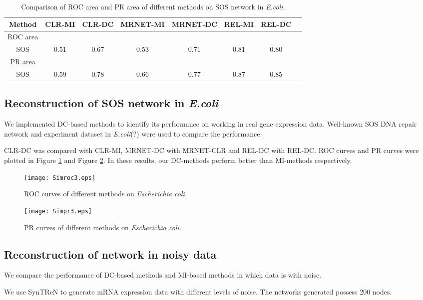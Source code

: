 \documentclass{bioinfo}
\begin{document}
\begin{table}[0.5\textwidth] \tiny
\centering \caption{Comparison of ROC area and PR area of different
methods on SOS network in \emph{E.coli}.}\label{roc-pr}
\begin{tabular}{cccccccc}
 \hline
 Method & CLR-MI & CLR-DC & MRNET-MI & MRNET-DC & REL-MI & REL-DC \\
 \hline
  ROC area\\
  SOS     & 0.51 & 0.67 & 0.53 & 0.71 & 0.81 & 0.80 \\
 PR area\\
  SOS   & 0.59 &0.78 & 0.66 & 0.77 & 0.87 & 0.85 \\
  \hline
\end{tabular}
\end{table}

\subsection{Reconstruction of SOS network in \emph{E.coli}}
We implemented DC-based methods to identify its performance on
working in real gene expression data. Well-known SOS DNA repair
network and experiment dataset in \emph{E.coli}(?) were used to
compare the performance.

CLR-DC was compared with CLR-MI, MRNET-DC with MRNET-CLR and REL-DC
with REL-DC. ROC curves and PR curves were plotted in Figure
\ref{roc-sos} and Figure \ref{pr-sos}. In these results, our
DC-methods perform better than MI-methods respectively.

\begin{figure}[!h]
  \texttt{[image: Simroc3.eps]}
  \caption{ROC curves of different methods on \emph{Escherichia coli.}}\label{roc-sos}
\end{figure}

\begin{figure}[!h]
  \texttt{[image: Simpr3.eps]}
  \caption{PR curves of different methods on \emph{Escherichia coli.}}\label{pr-sos}
\end{figure}

\subsection{Reconstruction of network in noisy data}
We compare the performance of DC-based methods and MI-based methods
in which data is with noise.

  We use SynTReN to generate mRNA expression data with different
levels of noise. The networks generated possess 200 nodes.
\end{document}
